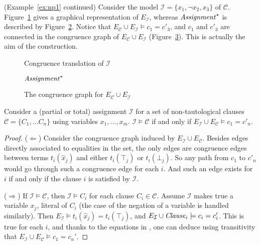 \documentclass[smallextended]{svjour3}
\begin{document}
\begin{example}\label{ex:np2} (Example~\ref{ex:np1} continued)  
Consider the model $\mathcal{I} = \{x_1, \neg x_2, x_3\}$ of\/ $\mathcal{C}$.
Figure~\ref{fig:npassignment} gives a graphical representation of
$E_{\mathcal{I}}$, whereas ${\it Assignment}^\star$ is described by
Figure~\ref{fig:npassignmentstar}.  Notice that
$E_{\mathcal{C}} \cup E_{\mathcal{I}} \models c_1 = c'_3$,
and $c_1$ and $c'_3$ are connected in the congruence graph
of $E_{\mathcal{C}} \cup E_{\mathcal{I}}$ (Figure~\ref{fig:npmodel}).
This is actually the aim of the construction.

\begin{figure}[ht]

\caption{Congruence translation of $\mathcal{I}$}
\label{fig:npassignment}
\end{figure}

\begin{figure}[ht]

\caption{${\it Assignment}^\star$}
\label{fig:npassignmentstar}
\end{figure}
\begin{figure}[ht]

\caption{The congruence graph for $E_{\mathcal{C}} \cup E_{\mathcal{I}}$}
\label{fig:npmodel}
\end{figure}
\end{example}

\begin{lemma}
\label{lemma:eqv}
Consider a (partial or total) assignment $\mathcal{I}$ for a set of
non-tautological clauses $\mathcal{C}= \{C_1, \dots C_n\}$ using variables
$x_1,\ldots, x_m$.  $\mathcal{I} \models \mathcal{C}$ if and only if
$E_{\mathcal{I}} \cup E_\mathcal{C} \models c_1 = c'_n$.
\end{lemma}
\begin{proof}
($\Leftarrow$)  Consider the congruence graph induced by
$E_{\mathcal{I}} \cup E_\mathcal{C}$.  Besides edges directly associated to
equalities in the set, the only edges are congruence edges between terms
$t_i(\hat{x}_j)$ and either $t_i(\top_j)$ or $t_i(\bot_j)$.  So any path from
$c_1$ to $c'_n$ would go through such a congruence edge for each $i$.
And such an edge exists for $i$ if and only if the clause $i$ is satisfied by
$\mathcal{I}$.

($\Rightarrow$)  If $\mathcal{I} \models \mathcal{C}$, then
$\mathcal{I} \models C_i$ for each clause $C_i \in \mathcal{C}$.  Assume
$\mathcal{I}$ makes true a variable $x_j$, literal of $C_i$ (the case of
the negation of a variable is handled similarly).  Then $E_{\mathcal{I}} \models
t_i(\hat{x}_j) = t_i(\top_j)$, and $E_{\mathcal{I}} \cup {\it Clause}_i
\models c_i = c_i'$.  This is true for each $i$, and
thanks to the equations in \Connect, one can deduce using transitivity that
$E_{\mathcal{I}} \cup E_\mathcal{C} \models c_1 = c_n'$.

\end{proof}
\end{document}

